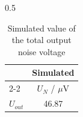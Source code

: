 \begin{spacing}{0.5} 
\begin{table}[htbp]
  \centering
  \renewcommand{\arraystretch}{0.8}
  \caption{Simulated value of the total output noise voltage}
    \begin{tabular}{|l|c|}
    \hline
    \rowcolor[rgb]{ .816,  .816,  .816}  &  \textbf{Simulated} \bigstrut\\
    \cline{2-2}\rowcolor[rgb]{ .816,  .816,  .816}\multirow{-2}{*}{\textbf{Total noise voltage}}&  $U_N$ / $\mu$V \bigstrut\\
    \hline
    \rowcolor[rgb]{ .816,  .816,  .816} $U_{out}$ & \cellcolor[rgb]{ 1,  1,  1}46.87 \bigstrut\\
    \hline
    \end{tabular}%
  \label{tab:sim2_2}%
\end{table}%
\end{spacing}